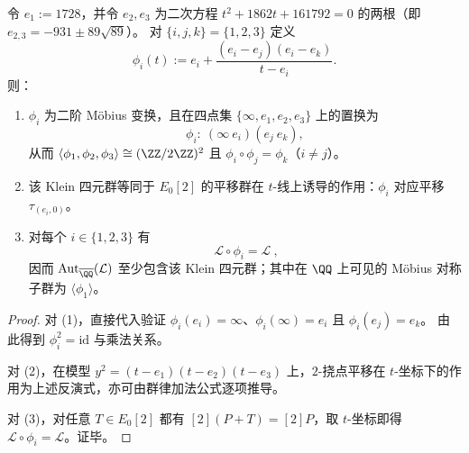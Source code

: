 \begin{theorem}\label{thm:xi-j-sextic-elliptic-lattes-klein-mobius}
令 \(e_1:=1728\)，并令 \(e_2,e_3\) 为二次方程 \(t^{2}+1862t+161792=0\) 的两根（即 \(e_{2,3}=-931\pm 89\sqrt{89}\)）。
对 \(\{i,j,k\}=\{1,2,3\}\) 定义
\[
\phi_i(t):=e_i+\frac{(e_i-e_j)(e_i-e_k)}{t-e_i}.
\]
则：
\begin{enumerate}
  \item \(\phi_i\) 为二阶 Möbius 变换，且在四点集 \(\{\infty,e_1,e_2,e_3\}\) 上的置换为
  \[
  \phi_i:\ (\infty\ e_i)(e_j\ e_k),
  \]
  从而 \(\langle \phi_1,\phi_2,\phi_3\rangle\cong (\ZZ/2\ZZ)^2\) 且 \(\phi_i\circ\phi_j=\phi_k\)（\(i\neq j\)）。
  \item 该 Klein 四元群等同于 \(E_0[2]\) 的平移群在 \(t\)-线上诱导的作用：\(\phi_i\) 对应平移 \(\tau_{(e_i,0)}\)。
  \item 对每个 \(i\in\{1,2,3\}\) 有
  \[
  \boxed{\ \mathcal L\circ \phi_i=\mathcal L\ },
  \]
  因而 \(\mathrm{Aut}_{\overline{\QQ}}(\mathcal L)\) 至少包含该 Klein 四元群；其中在 \(\QQ\) 上可见的 Möbius 对称子群为 \(\langle \phi_1\rangle\)。
\end{enumerate}
\end{theorem}
\begin{proof}
对 (1)，直接代入验证 \(\phi_i(e_i)=\infty\)、\(\phi_i(\infty)=e_i\) 且 \(\phi_i(e_j)=e_k\)。
由此得到 \(\phi_i^2=\mathrm{id}\) 与乘法关系。
\par
对 (2)，在模型 \(y^2=(t-e_1)(t-e_2)(t-e_3)\) 上，\(2\)-挠点平移在 \(t\)-坐标下的作用为上述反演式，亦可由群律加法公式逐项推导。
\par
对 (3)，对任意 \(T\in E_0[2]\) 都有 \([2](P+T)=[2]P\)，取 \(t\)-坐标即得 \(\mathcal L\circ\phi_i=\mathcal L\)。证毕。
\end{proof}

